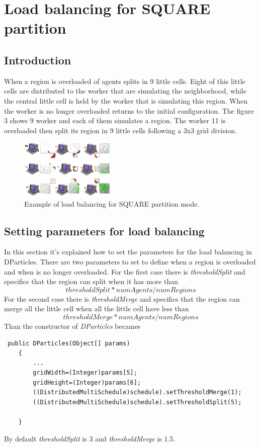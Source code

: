 \documentclass[12pt]{article}
\begin{document}
\section{Load balancing for SQUARE partition}

\subsection{Introduction}
When a region is overloaded of agents splits in 9 little cells. Eight of this little cells are distributed to the worker that are simulating the neighborhood, while the central little cell is held by the worker that is simulating this region. When the worker is no longer overloaded returns to the initial configuration.
The figure 3 shows 9 worker and each of them simulates a region. The worker 11 is overloaded then split its region in 9 little cells following a 3x3 grid division.
\begin{figure}
\centering
\includegraphics[width=0.4\textwidth]{LoadBalancing.png}
\caption{Example of load balancing for SQUARE partition mode.}
\end{figure}
\subsection{Setting parameters for load balancing}
In this section it's explained how to set the parameters for the load balancing in DParticles. There are two parameters to set to define when a region is overloaded and when is no longer overloaded. For the first case there is  \textit{thresholdSplit} and specifics that the region can split when it has more than \[thresholdSplit*numAgents/numRegions\] For the second case there is  \textit{thresholdMerge} and specifics that the region can merge all the little cell when all the little cell have less than \[thresholdMerge*numAgents/numRegions\] Than the constructor of  \textit{DParticles} becames 

\begin{lstlisting}
 public DParticles(Object[] params)
    {    	
    	...
    	gridWidth=(Integer)params[5];
    	gridHeight=(Integer)params[6];
    	((DistributedMultiSchedule)schedule).setThresholdMerge(1);
        ((DistributedMultiSchedule)schedule).setThresholdSplit(5);

    }    
\end{lstlisting}

By default \textit{thresholdSplit} is 3 and \textit{thresholdMerge} is 1.5.
\end{document}
